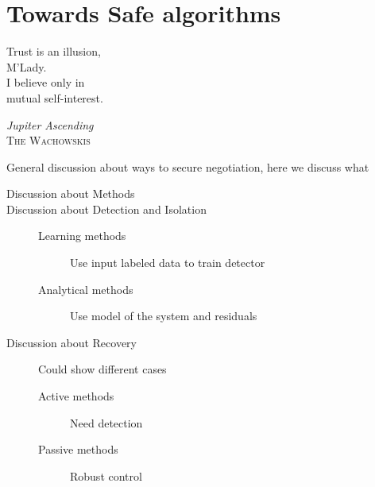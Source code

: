 \documentclass[../main.tex]{subfiles}
\begin{document}
\printbibliography

\chapter{Towards Safe algorithms}

\epigraph{\centering Trust is an illusion, \\M'Lady. \\I believe only in \\mutual self-interest.}
{\textit{Jupiter Ascending}\\\textsc{The Wachowskis}}

\minitoc
General discussion about ways to secure negotiation, here we discuss what
\begin{description}
  \item[Discussion about Methods]
  \item[Discussion about Detection and Isolation]
        \begin{description}
          \item[Learning methods] Use input labeled data to train detector
          \item[Analytical methods] Use model of the system and residuals
        \end{description}
  \item[Discussion about Recovery] Could show different cases
        \begin{description}
          \item[Active methods] Need detection
          \item[Passive methods] Robust control
        \end{description}


\end{description}
\end{document}
